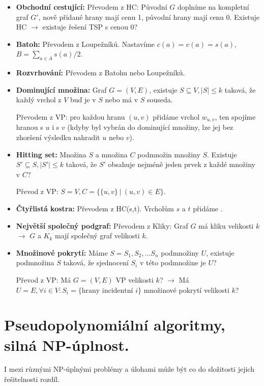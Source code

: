\documentclass[11pt]{report} %
\numberwithin{equation}{section}
\begin{document}
\begin{itemize}
\item \textbf{Obchodní cestující:} Převodem z HC: Původní $G$ doplníme na kompletní graf $G'$, nově přidané hrany mají cenu 1, původní hrany mají cenu 0. Existuje HC $\to$ existuje řešení TSP s cenou 0?
\item \textbf{Batoh:} Převodem z Loupežníků. Nastavíme $c(a) = v(a) = s(a)$, $B = \sum_{a\in A} s(a)/2$.
\item \textbf{Rozvrhování:} Převodem z Batohu nebo Loupežníků.
\item \textbf{Dominující množina:} Graf $G=(V,E)$, existuje $S \subseteq V, |S| \leq k$ taková, že každý vrchol z $V$ buď je v $S$ nebo má v $S$ souseda.

Převodem z VP: pro každou hranu $(u,v)$ přidáme vrchol $w_{u,v}$, ten spojíme hranou s $u$ i s $v$ (kdyby byl vybrán do dominující množiny, lze jej bez zhoršení výsledku nahradit $u$ nebo $v$).
\item \textbf{Hitting set:} Množina $S$ a množina $C$ podmnožin množiny $S$. Existuje $S'\subseteq S, |S'| \leq k$ taková, že $S'$ obsahuje nejméně jeden prvek z každé množiny v $C$?

Převod z VP: $S = V, C = \{\{u,v\}\ |\ (u,v)\in E\}$. 
\item \textbf{Čtyřlistá kostra:} Převodem z HC(s,t). Vrcholům $s$ a $t$ přidáme .
\item \textbf{Největší společný podgraf:} Převodem z Kliky: Graf $G$ má kliku velikosti $k$ $\to$ $G$ a $K_k$ mají společný graf velikosti $k$.
\item \textbf{Množinové pokrytí:} Máme $S = S_1, S_2, \dots S_n$ podmnožiny $U$, existuje podmnožina $S$ taková, že sjednocení $S_i$ v této podmnožine je $U$? 

Převod z VP: Má $G=(V,E)$ VP velikosti $k$? $\to$ Má $U = E, \forall i \in V : S_i = \{\text{hrany incidentní $i$}\}$  množinové pokrytí velikosti $k$?
\end{itemize}


\section{Pseudopolynomiální algoritmy, silná NP-úplnost.}
I mezi různými NP-úplnými problémy a úlohami může být co do složitosti jejich řešitelnosti rozdíl. 
\end{document}
